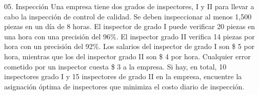 \begin{frameExample}{05. Inspección}{}
Una empresa tiene dos grados de inspectores, I y II para llevar a cabo la inspección de control de calidad. Se deben inspeccionar al menos 1,500 piezas en un día de 8 horas. El inspector de grado I puede \alert{verificar 20 piezas en una hora} con una precisión del 96\%. El inspector grado II  \alert{verifica 14 piezas por hora} con un precisión del 92\%. Los salarios del inspector de grado I son \$ 5 por hora, mientras que los del inspector grado II  son \$ 4 por hora. Cualquier \alert{error} cometido por un inspector \alert{cuesta \$ 3 a la empresa}. Si hay, en total, 10 inspectores grado I
 y 15 inspectores de grado II en la empresa, encuentre la asignación óptima de inspectores que minimiza el costo diario de inspección.
    
\end{frameExample}




